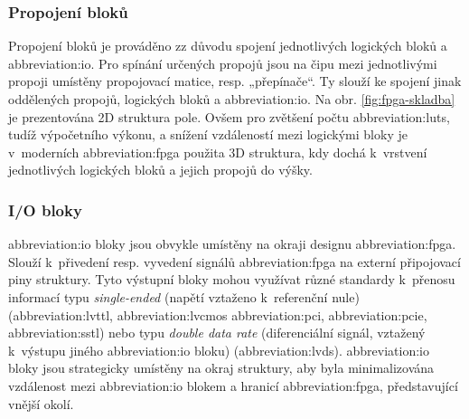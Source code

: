 \documentclass[a4paper, twoside, 11pt]{article}
\begin{document}
		\subsubsection{Propojení bloků}
			Propojení bloků je prováděno zz důvodu spojení jednotlivých logických bloků a \gls{abbreviation:io}. Pro spínání určených propojů jsou na čipu mezi jednotlivými propoji umístěny propojovací matice, resp. „přepínače“. Ty slouží ke spojení jinak oddělených propojů, logických bloků a \gls{abbreviation:io}. \cite{Sass2010}
			Na obr. \ref{fig:fpga-skladba} je prezentována 2D struktura pole. Ovšem pro zvětšení počtu \gls{abbreviation:luts}, tudíž výpočetního výkonu, a snížení vzdáleností mezi logickými bloky je v~moderních \gls{abbreviation:fpga} použita 3D struktura, kdy dochá k~vrstvení jednotlivých logických bloků a jejich propojů do výšky. \cite{pang-beginning-fpga}

		\subsubsection{I/O bloky}
		\gls{abbreviation:io} bloky jsou obvykle umístěny na okraji designu \gls{abbreviation:fpga}. Slouží k~přivedení resp. vyvedení signálů \gls{abbreviation:fpga} na externí připojovací piny struktury. Tyto výstupní bloky mohou využívat různé standardy k~přenosu informací typu \textit{single-ended} (napětí vztaženo k~referenční nule) (\gls{abbreviation:lvttl}, \gls{abbreviation:lvcmos} \gls{abbreviation:pci}, \gls{abbreviation:pcie}, \gls{abbreviation:sstl}) nebo typu \textit{double data rate} (diferenciální signál, vztažený k~výstupu jiného \gls{abbreviation:io} bloku) (\gls{abbreviation:lvds}). \gls{abbreviation:io} bloky jsou strategicky umístěny na okraj struktury, aby byla minimalizována vzdálenost mezi \gls{abbreviation:io} blokem a hranicí \gls{abbreviation:fpga}, představující vnější okolí. \cite{Sass2010} \cite{pang-beginning-fpga}
\end{document}
